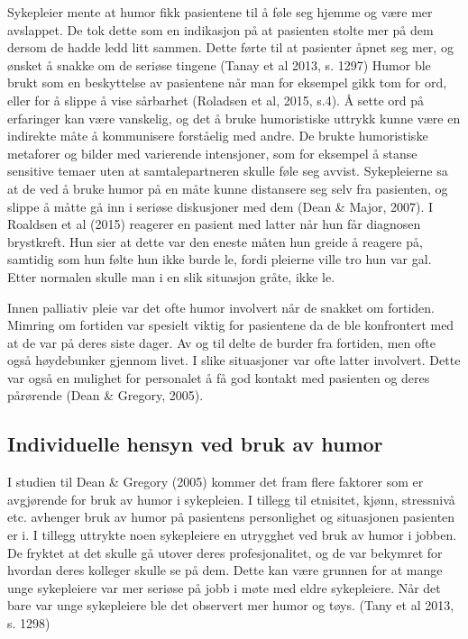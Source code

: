 Sykepleier mente at humor fikk pasientene til å føle seg hjemme og være mer
avslappet. De tok dette som en indikasjon på at pasienten stolte mer på dem
dersom de hadde ledd litt sammen. Dette førte til at pasienter åpnet seg mer,
og ønsket å snakke om de seriøse tingene (Tanay et al 2013, s. 1297) Humor ble
brukt som en beskyttelse av pasientene når man for eksempel gikk tom for ord,
eller for å slippe å vise sårbarhet (Roladsen et al, 2015, s.4). Å sette ord på
erfaringer kan være vanskelig, og det å bruke humoristiske uttrykk kunne være
en indirekte måte å kommunisere forståelig med andre. De brukte humoristiske
metaforer og bilder med varierende intensjoner, som for eksempel å stanse
sensitive temaer uten at samtalepartneren skulle føle seg avvist.  Sykepleierne
sa at de ved å bruke humor på en måte kunne distansere seg selv fra pasienten,
og slippe å måtte gå inn i seriøse diskusjoner med dem (Dean \&{} Major, 2007).  I
Roaldsen et al (2015) reagerer en pasient med latter når hun får diagnosen
brystkreft. Hun sier at dette var den eneste måten hun greide å reagere på,
samtidig som hun følte hun ikke burde le, fordi pleierne ville tro hun var gal.
Etter normalen skulle man i en slik situasjon gråte, ikke le.  

Innen palliativ pleie var det ofte humor involvert når de snakket om fortiden.
Mimring om fortiden var spesielt viktig for pasientene da de ble konfrontert
med at de var på deres siste dager. Av og til delte de burder fra fortiden, men
ofte også høydebunker gjennom livet. I slike situasjoner var ofte latter
involvert. Dette var også en mulighet for personalet å få god kontakt med
pasienten og deres pårørende (Dean \&{} Gregory, 2005). 

\subsection{Individuelle hensyn ved bruk av humor}

I studien til Dean \&{} Gregory (2005) kommer det fram flere faktorer som er
avgjørende for bruk av humor i sykepleien. I tillegg til etnisitet, kjønn,
stressnivå etc. avhenger bruk av humor på pasientens personlighet og
situasjonen pasienten er i. I tillegg uttrykte noen sykepleiere en utrygghet
ved bruk av humor i jobben. De fryktet at det skulle gå utover deres
profesjonalitet, og de var bekymret for hvordan deres kolleger skulle se på
dem. Dette kan være grunnen for at mange unge sykepleiere var mer seriøse på
jobb i møte med eldre sykepleiere. Når det bare var unge sykepleiere ble det
observert mer humor og tøys. (Tany et al 2013, s. 1298)

